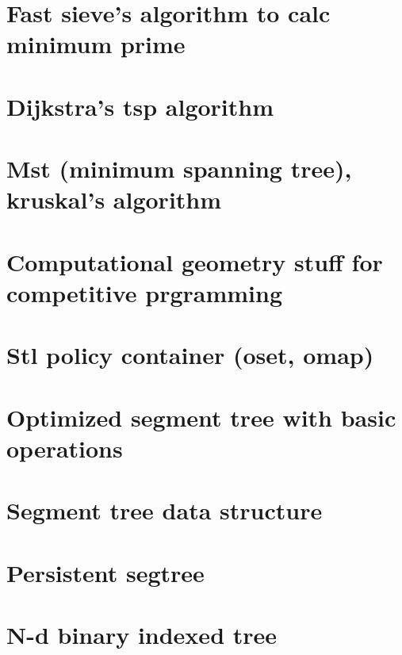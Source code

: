 \section{Fast sieve's algorithm to calc minimum prime}
\raggedbottom

\section{Dijkstra's tsp algorithm}
\raggedbottom

\section{Mst (minimum spanning tree), kruskal's algorithm}
\raggedbottom

\section{Computational geometry stuff for competitive prgramming}
\raggedbottom

\section{Stl policy container (oset, omap)}
\raggedbottom

\section{Optimized segment tree with basic operations}
\raggedbottom

\section{Segment tree data structure}
\raggedbottom

\section{Persistent segtree}
\raggedbottom

\section{N-d binary indexed tree}
\raggedbottom

